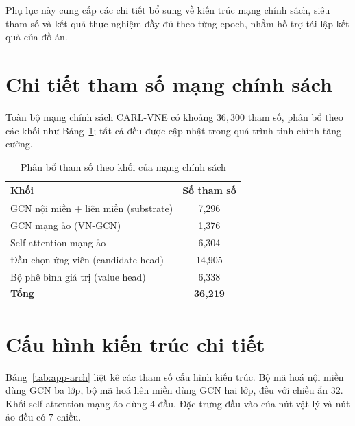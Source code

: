 \documentclass[../DoAn.tex]{subfiles}
\begin{document}
Phụ lục này cung cấp các chi tiết bổ sung về kiến trúc mạng chính sách, siêu tham số và kết quả thực nghiệm đầy đủ theo từng epoch, nhằm hỗ trợ tái lập kết quả của đồ án.

\section{Chi tiết tham số mạng chính sách}
\label{sec:app-params}

Toàn bộ mạng chính sách CARL-VNE có khoảng $36{,}300$ tham số, phân bổ theo các khối như Bảng~\ref{tab:app-params}; tất cả đều được cập nhật trong quá trình tinh chỉnh tăng cường.

\begin{table}[H]
\centering
\caption{Phân bổ tham số theo khối của mạng chính sách}
\label{tab:app-params}
\begin{tabular}{lc}
\toprule
\textbf{Khối} & \textbf{Số tham số} \\
\midrule
GCN nội miền + liên miền (substrate) & 7{,}296  \\
GCN mạng ảo (VN-GCN)                  & 1{,}376  \\
Self-attention mạng ảo               & 6{,}304  \\
Đầu chọn ứng viên (candidate head)   & 14{,}905 \\
Bộ phê bình giá trị (value head)     & 6{,}338  \\
\midrule
\textbf{Tổng}                        & \textbf{36{,}219} \\
\bottomrule
\end{tabular}
\end{table}

\section{Cấu hình kiến trúc chi tiết}
\label{sec:app-arch}

Bảng~\ref{tab:app-arch} liệt kê các tham số cấu hình kiến trúc. Bộ mã hoá nội miền dùng GCN ba lớp, bộ mã hoá liên miền dùng GCN hai lớp, đều với chiều ẩn $32$. Khối self-attention mạng ảo dùng $4$ đầu. Đặc trưng đầu vào của nút vật lý và nút ảo đều có $7$ chiều.
\end{document}

